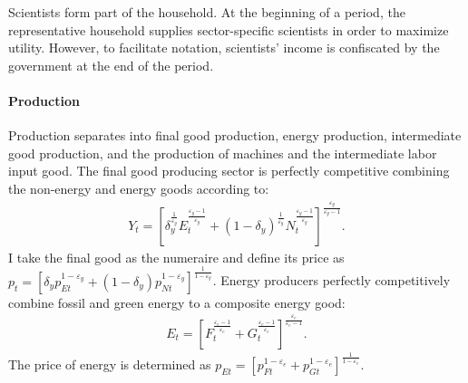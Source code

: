 Scientists form part of the household. At the beginning of a period,  the representative household supplies sector-specific scientists in order to maximize utility. However, to facilitate notation, scientists' income is confiscated by the government at the end of the period. %


\paragraph{Production}
Production separates into final good production, energy production, intermediate good production, and the production of machines and the intermediate labor input good. 
The final good producing sector is perfectly competitive combining the non-energy and energy goods according to:
\begin{align}
Y_t=\left[\delta_y^\frac{1}{\varepsilon_y}E_{t}^{\frac{\varepsilon_y-1}{\varepsilon_y}}+(1-\delta_y)^\frac{1}{\varepsilon_y}N_{t}^{\frac{\varepsilon_y-1}{\varepsilon_y}}\right]^\frac{\varepsilon_y}{\varepsilon_y-1}.
\end{align} 
I take the final good as the numeraire and define its price as $p_t=\left[\delta_yp_{Et}^{1-\varepsilon_y}+(1-\delta_y)p_{Nt}^{1-\varepsilon_y}\right]^{\frac{1}{1-\varepsilon_y}}$.
Energy producers perfectly competitively combine fossil and green energy to a composite energy good:
\begin{align}
E_t=\left[F_t^\frac{\varepsilon_e-1}{\varepsilon_e}+G_t^\frac{\varepsilon_e-1}{\varepsilon_e}\right]^\frac{\varepsilon_e}{\varepsilon_e-1}.
\end{align}
The price of energy is determined as  $p_{Et}= \left[p_{Ft}^{1-\varepsilon_e}+p_{Gt}^{1-\varepsilon_e}\right]^\frac{1}{{1-\varepsilon_e}}$.

